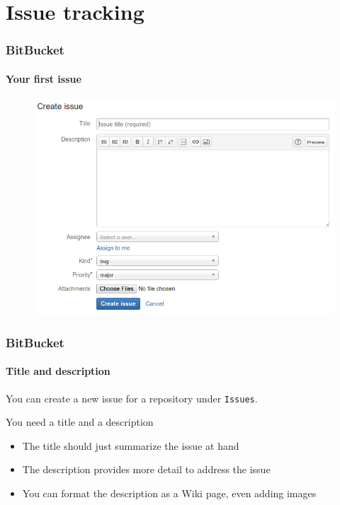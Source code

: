 \section{Issue tracking}

\begin{frame}
\frametitle{BitBucket}
\framesubtitle{Your first issue}

\begin{figure}
\includegraphics[width=1.0\textwidth]{lecture04/img/createnewissue.png}
\end{figure}

\end{frame}

\begin{frame}
\frametitle{BitBucket}
\framesubtitle{Title and description}

You can create a new issue for a repository under \texttt{Issues}.

\bigskip

\begin{block}{You need a title and a description}
\begin{itemize}
\item The title should just summarize the issue at hand
\item The description provides more detail to address the issue
\item You can format the description as a Wiki page, even adding images
\end{itemize}
\end{block}

\end{frame}

